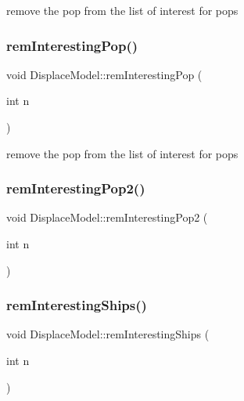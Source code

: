 remove the pop from the list of interest for pops 

\mbox{\label{class_displace_model_a7e4d9fc5fcfe94a705de61e3e75263de}} 
\subsubsection{\texorpdfstring{remInterestingPop()}{remInterestingPop()}}
{\footnotesize\ttfamily void Displace\+Model\+::rem\+Interesting\+Pop (\begin{DoxyParamCaption}\item[{int}]{n }\end{DoxyParamCaption})}



remove the pop from the list of interest for pops 

\mbox{\label{class_displace_model_aef4e9af286d63040df76351a6ba01e0e}} 
\subsubsection{\texorpdfstring{remInterestingPop2()}{remInterestingPop2()}}
{\footnotesize\ttfamily void Displace\+Model\+::rem\+Interesting\+Pop2 (\begin{DoxyParamCaption}\item[{int}]{n }\end{DoxyParamCaption})}

\mbox{\label{class_displace_model_a8f5ff0d004941db5116b9775377c7284}} 
\subsubsection{\texorpdfstring{remInterestingShips()}{remInterestingShips()}}
{\footnotesize\ttfamily void Displace\+Model\+::rem\+Interesting\+Ships (\begin{DoxyParamCaption}\item[{int}]{n }\end{DoxyParamCaption})\hspace{0.3cm}{\ttfamily [inline]}}

